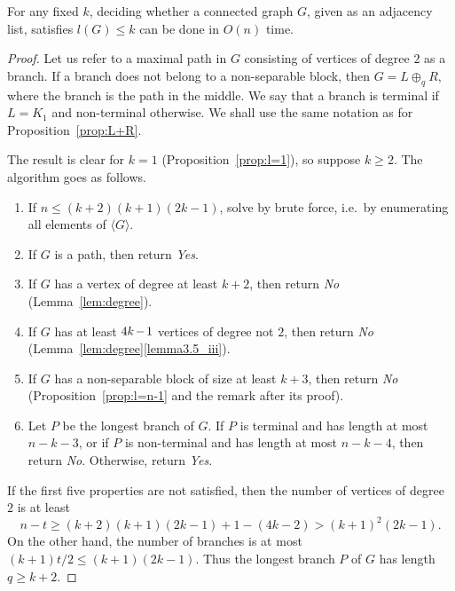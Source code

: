 \documentclass[ALCO,ThmDefs,Unicode,epreuves]{cedram}
\newcommand{\genset}[1]{\langle#1\rangle}
\newcommand*{\Mk}{\mkern -2mu}
\begin{document}
\begin{theorem} \label{th:l_linear_time}
 For any fixed $k$, deciding whether a connected graph $G$,
 given as an adjacency list, satisfies $l(G) \le k$ can be done in $O(n)$
 time.
\end{theorem}
\begin{proof}
 Let us refer to a maximal path in $G$ consisting of vertices of degree $2$ as
 a branch. If a branch does not belong to a non-separable block, then $G = L
 \oplus_q R$, where the branch is the path in the middle. We say that a branch
 is terminal if $L = K_1$ and non-terminal otherwise. We shall use the same
 notation as for Proposition~\ref{prop:L+R}.

 The result is clear for $k=1$ (Proposition~\ref{prop:l=1}), so suppose $k \ge
 2$. The algorithm goes as follows.
 \begin{enumerate}

 \item
 \label{it:1} If $n \le (k+2)(k+1) (2k-1)$, solve by brute force, i.e.\ by
 enumerating all elements of $\genset{G}$.

 \item
 \label{it:2} If $G$ is a path, then return \emph{Yes}.

 \item
 \label{it:3} If $G$ has a vertex of degree at least $k+2$, then return
 \emph{No} (Lemma~\ref{lem:degree}).

 \item
 \label{it:4} If $G$ has at least $4k\Mk -\Mk 1$ vertices of degree not $2$, then
 return \emph{No} (Lemma~\ref{lem:degree}\ref{lemma3.5_iii}).

 \item
 \label{it:5} If $G$ has a non-separable block of size at least $k+3$,
 then
 return \emph{No} (Proposition~\ref{prop:l=n-1} and the remark after its
 proof).

 \item
 \label{it:6} Let $P$ be the longest branch of $G$. If $P$ is terminal and
 has length at most $n - k - 3$, or if $P$ is non-terminal and has length
 at most $n - k - 4$, then return \emph{No}. Otherwise, return \emph{Yes}.
 \end{enumerate}

 If the first five properties are not satisfied, then the number of vertices
 of degree $2$ is at least 
 \[
 n - t \ge (k+2)(k+1) (2k-1) + 1 - (4k-2) > (k+1)^2 (2k-1).
 \]
 On the other hand, the number of branches is at most $(k+1)t/2 \le
 (k+1)(2k-1)$. Thus the longest branch $P$ of $G$ has length $q \ge k + 2$. 


\end{proof}
\end{document}
